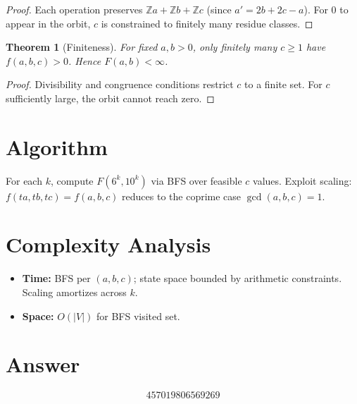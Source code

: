 \documentclass[11pt]{article}
\newtheorem{theorem}{Theorem}
\begin{document}
\begin{proof}
Each operation preserves $\mathbb{Z}a + \mathbb{Z}b + \mathbb{Z}c$ (since $a' = 2b+2c-a$). For $0$ to appear in the orbit, $c$ is constrained to finitely many residue classes.
\end{proof}

\begin{theorem}[Finiteness]
For fixed $a,b>0$, only finitely many $c \ge 1$ have $f(a,b,c)>0$. Hence $F(a,b) < \infty$.
\end{theorem}

\begin{proof}
Divisibility and congruence conditions restrict $c$ to a finite set. For $c$ sufficiently large, the orbit cannot reach zero.
\end{proof}

\section{Algorithm}

For each $k$, compute $F(6^k, 10^k)$ via BFS over feasible $c$ values. Exploit scaling: $f(ta,tb,tc) = f(a,b,c)$ reduces to the coprime case $\gcd(a,b,c)=1$.

\section{Complexity Analysis}

\begin{itemize}
\item \textbf{Time:} BFS per $(a,b,c)$; state space bounded by arithmetic constraints. Scaling amortizes across $k$.
\item \textbf{Space:} $O(|V|)$ for BFS visited set.
\end{itemize}

\section{Answer}

\[
\boxed{457019806569269}
\]
\end{document}
